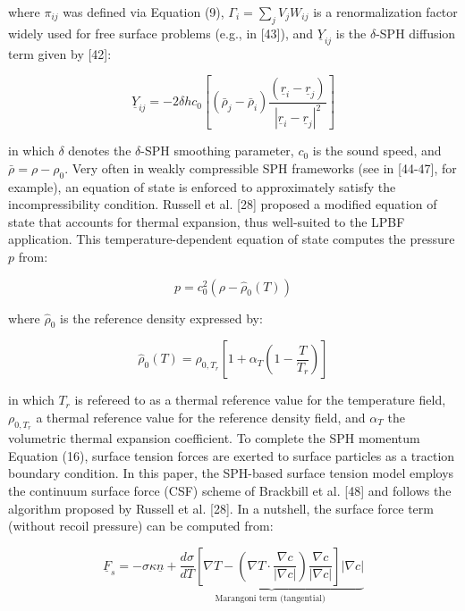 \documentclass[10pt]{article}
\begin{document}
where $\pi_{i j}$ was defined via Equation (9), $\Gamma_{i}=\sum_{j} V_{j} W_{i j}$ is a renormalization factor widely used for free surface problems (e.g., in [43]), and $\underline{Y}_{i j}$ is the $\delta$-SPH diffusion term given by [42]:


\begin{equation*}
\underline{Y}_{i j}=-2 \delta h c_{0}\left[\left(\bar{\rho}_{j}-\bar{\rho}_{i}\right) \frac{\left(\underline{r}_{i}-\underline{r}_{j}\right)}{\left|\underline{r}_{i}-\underline{r}_{j}\right|^{2}}\right] \tag{17}
\end{equation*}


in which $\delta$ denotes the $\delta$-SPH smoothing parameter, $c_{0}$ is the sound speed, and $\bar{\rho}=\rho-\rho_{0}$. Very often in weakly compressible SPH frameworks (see in [44-47], for example), an equation of state is enforced to approximately satisfy the incompressibility condition. Russell et al. [28] proposed a modified equation of state that accounts for thermal expansion, thus well-suited to the LPBF application. This temperature-dependent equation of state computes the pressure $p$ from:


\begin{equation*}
p=c_{0}^{2}\left(\rho-\hat{\rho}_{0}(T)\right) \tag{18}
\end{equation*}


where $\hat{\rho}_{0}$ is the reference density expressed by:


\begin{equation*}
\hat{\rho}_{0}(T)=\rho_{0, T_{r}}\left[1+\alpha_{T}\left(1-\frac{T}{T_{r}}\right)\right] \tag{19}
\end{equation*}


in which $T_{r}$ is refereed to as a thermal reference value for the temperature field, $\rho_{0, T_{r}}$ a thermal reference value for the reference density field, and $\alpha_{T}$ the volumetric thermal expansion coefficient. To complete the SPH momentum Equation (16), surface tension forces are exerted to surface particles as a traction boundary condition. In this paper, the SPH-based surface tension model employs the continuum surface force (CSF) scheme of Brackbill et al. [48] and follows the algorithm proposed by Russell et al. [28]. In a nutshell, the surface force term (without recoil pressure) can be computed from:


\begin{equation*}
\underline{F}_{s}=-\sigma \kappa \underline{n}+\underbrace{\frac{d \sigma}{d T}\left[\nabla T-\left(\nabla T \cdot \frac{\nabla c}{|\nabla c|}\right) \frac{\nabla c}{|\nabla c|}\right]|\nabla c|}_{\text {Marangoni term (tangential) }} \tag{20}
\end{equation*}
\end{document}
